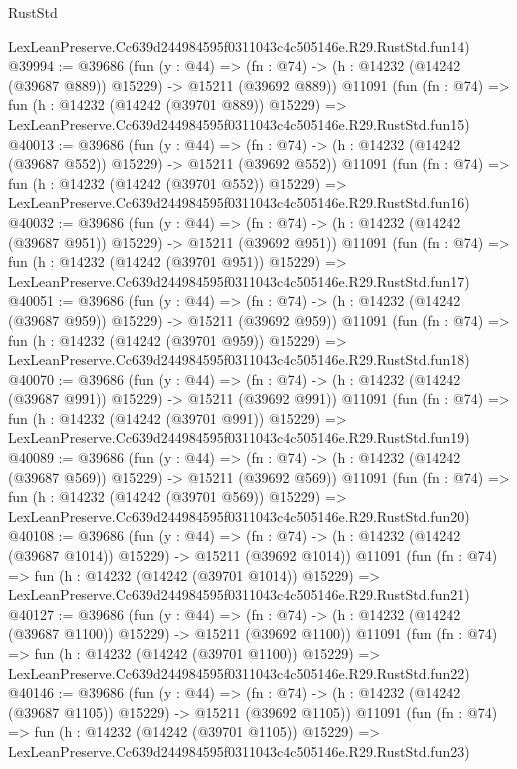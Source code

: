 \begin{lexlean}{RustStd}
\begin{coremodule}
    LexLeanPreserve.Cc639d244984595f0311043c4c505146e.R29.RustStd.fun14)
@39994 := @39686
    (fun (y : @44) =>
    (fn : @74) -> (h : @14232 (@14242 (@39687 @889)) @15229) -> @15211 (@39692 @889))
    @11091
    (fun (fn : @74) =>
    fun (h : @14232 (@14242 (@39701 @889)) @15229) =>
    LexLeanPreserve.Cc639d244984595f0311043c4c505146e.R29.RustStd.fun15)
@40013 := @39686
    (fun (y : @44) =>
    (fn : @74) -> (h : @14232 (@14242 (@39687 @552)) @15229) -> @15211 (@39692 @552))
    @11091
    (fun (fn : @74) =>
    fun (h : @14232 (@14242 (@39701 @552)) @15229) =>
    LexLeanPreserve.Cc639d244984595f0311043c4c505146e.R29.RustStd.fun16)
@40032 := @39686
    (fun (y : @44) =>
    (fn : @74) -> (h : @14232 (@14242 (@39687 @951)) @15229) -> @15211 (@39692 @951))
    @11091
    (fun (fn : @74) =>
    fun (h : @14232 (@14242 (@39701 @951)) @15229) =>
    LexLeanPreserve.Cc639d244984595f0311043c4c505146e.R29.RustStd.fun17)
@40051 := @39686
    (fun (y : @44) =>
    (fn : @74) -> (h : @14232 (@14242 (@39687 @959)) @15229) -> @15211 (@39692 @959))
    @11091
    (fun (fn : @74) =>
    fun (h : @14232 (@14242 (@39701 @959)) @15229) =>
    LexLeanPreserve.Cc639d244984595f0311043c4c505146e.R29.RustStd.fun18)
@40070 := @39686
    (fun (y : @44) =>
    (fn : @74) -> (h : @14232 (@14242 (@39687 @991)) @15229) -> @15211 (@39692 @991))
    @11091
    (fun (fn : @74) =>
    fun (h : @14232 (@14242 (@39701 @991)) @15229) =>
    LexLeanPreserve.Cc639d244984595f0311043c4c505146e.R29.RustStd.fun19)
@40089 := @39686
    (fun (y : @44) =>
    (fn : @74) -> (h : @14232 (@14242 (@39687 @569)) @15229) -> @15211 (@39692 @569))
    @11091
    (fun (fn : @74) =>
    fun (h : @14232 (@14242 (@39701 @569)) @15229) =>
    LexLeanPreserve.Cc639d244984595f0311043c4c505146e.R29.RustStd.fun20)
@40108 := @39686
    (fun (y : @44) =>
    (fn : @74) -> (h : @14232 (@14242 (@39687 @1014)) @15229) -> @15211 (@39692 @1014))
    @11091
    (fun (fn : @74) =>
    fun (h : @14232 (@14242 (@39701 @1014)) @15229) =>
    LexLeanPreserve.Cc639d244984595f0311043c4c505146e.R29.RustStd.fun21)
@40127 := @39686
    (fun (y : @44) =>
    (fn : @74) -> (h : @14232 (@14242 (@39687 @1100)) @15229) -> @15211 (@39692 @1100))
    @11091
    (fun (fn : @74) =>
    fun (h : @14232 (@14242 (@39701 @1100)) @15229) =>
    LexLeanPreserve.Cc639d244984595f0311043c4c505146e.R29.RustStd.fun22)
@40146 := @39686
    (fun (y : @44) =>
    (fn : @74) -> (h : @14232 (@14242 (@39687 @1105)) @15229) -> @15211 (@39692 @1105))
    @11091
    (fun (fn : @74) =>
    fun (h : @14232 (@14242 (@39701 @1105)) @15229) =>
    LexLeanPreserve.Cc639d244984595f0311043c4c505146e.R29.RustStd.fun23)

\end{coremodule}
\end{lexlean}
